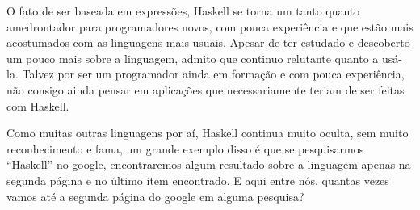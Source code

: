 \begin{apendicesenv}
    O fato de ser baseada em expressões, Haskell se torna um tanto quanto amedrontador para programadores novos, com pouca experiência e que estão
    mais acostumados com as linguagens mais usuais. Apesar de ter estudado e descoberto um pouco mais sobre a linguagem, admito que continuo 
    relutante quanto a usá-la. Talvez por ser um programador ainda em formação e com pouca experiência, não consigo ainda pensar em aplicações 
    que necessariamente teriam de ser feitas com Haskell.

    Como muitas outras linguagens por aí, Haskell continua muito oculta, sem muito reconhecimento e fama, um grande exemplo disso é que se pesquisarmos
    ``Haskell'' no google, encontraremos algum resultado sobre a linguagem apenas na segunda página e no último item encontrado. E aqui entre nós, quantas vezes vamos
    até a segunda página do google em alguma pesquisa?

\end{apendicesenv}


\printindex